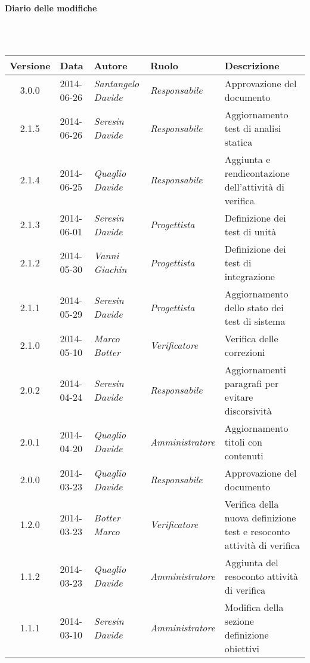 \noindent\begin{Large}\textbf{Diario delle modifiche}\end{Large}\\
\\
\begin{small}
\begin{tabular}{|c|p{1.8cm}|p{2.8cm}|p{2.8cm}|p{3.5cm}|}
\hline
Versione & Data & Autore & Ruolo & Descrizione \\
\hline
\hline
3.0.0 & 2014-06-26 & 
\textit{Santangelo Davide} &
\textit{Responsabile} &  Approvazione del documento\\
\hline
2.1.5 & 2014-06-26 & 
\textit{Seresin Davide} &
\textit{Responsabile} &  Aggiornamento test di analisi statica\\
\hline
2.1.4 & 2014-06-25 & 
\textit{Quaglio Davide} &
\textit{Responsabile} &  Aggiunta e rendicontazione dell'attività di verifica\\
\hline
2.1.3 & 2014-06-01 & 
\textit{Seresin Davide} &
\textit{Progettista} &  Definizione dei test di unità\\
\hline
2.1.2 & 2014-05-30 & 
\textit{Vanni Giachin} &
\textit{Progettista} &  Definizione dei test di integrazione\\
\hline
2.1.1 & 2014-05-29 & 
\textit{Seresin Davide} &
\textit{Progettista} &  Aggiornamento dello stato dei test di sistema\\
\hline
2.1.0 & 2014-05-10 & 
\textit{Marco Botter} &
\textit{Verificatore} &  Verifica delle correzioni\\
\hline
2.0.2 & 2014-04-24 & 
\textit{Seresin Davide} &
\textit{Responsabile} &  Aggiornamenti paragrafi per evitare discorsività\\
\hline
2.0.1 & 2014-04-20 & 
\textit{Quaglio Davide} &
\textit{Amministratore} &  Aggiornamento titoli con contenuti\\
\hline
2.0.0 & 2014-03-23 & 
\textit{Quaglio Davide} &
\textit{Responsabile} &  Approvazione del documento\\
\hline
1.2.0 & 2014-03-23 & 
\textit{Botter Marco} &
\textit{Verificatore} &  Verifica della nuova definizione test e resoconto attività di verifica\\
\hline
1.1.2 & 2014-03-23 & 
\textit{Quaglio Davide} &
\textit{Amministratore} &  Aggiunta del resoconto attività di verifica\\
\hline
1.1.1 & 2014-03-10 & 
\textit{Seresin Davide} &
\textit{Amministratore} &  Modifica della sezione definizione obiettivi\\

\end{tabular}
\end{small}
